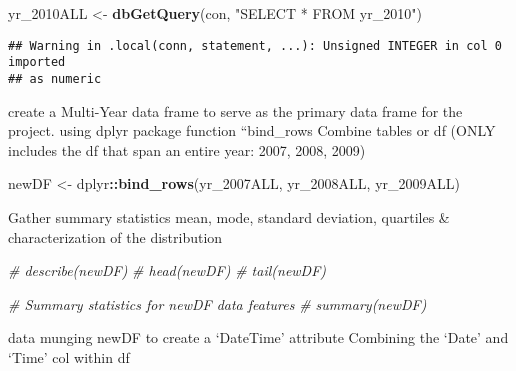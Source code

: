 \documentclass[]{article}
\newenvironment{Shaded}{\begin{snugshade}}{\end{snugshade}}
\newcommand{\CommentTok}[1]{\textcolor[rgb]{0.56,0.35,0.01}{\textit{#1}}}
\newcommand{\DataTypeTok}[1]{\textcolor[rgb]{0.13,0.29,0.53}{#1}}
\newcommand{\KeywordTok}[1]{\textcolor[rgb]{0.13,0.29,0.53}{\textbf{#1}}}
\newcommand{\NormalTok}[1]{#1}
\newcommand{\OperatorTok}[1]{\textcolor[rgb]{0.81,0.36,0.00}{\textbf{#1}}}
\newcommand{\OtherTok}[1]{\textcolor[rgb]{0.56,0.35,0.01}{#1}}
\newcommand{\StringTok}[1]{\textcolor[rgb]{0.31,0.60,0.02}{#1}}
\begin{document}
\begin{Shaded}
\begin{Highlighting}[]
\NormalTok{yr_2010ALL <-}\StringTok{ }\KeywordTok{dbGetQuery}\NormalTok{(con, }\StringTok{"SELECT * FROM yr_2010"}\NormalTok{)}
\end{Highlighting}
\end{Shaded}

\begin{verbatim}
## Warning in .local(conn, statement, ...): Unsigned INTEGER in col 0 imported
## as numeric
\end{verbatim}

create a Multi-Year data frame to serve as the primary data frame for
the project. using dplyr package function ``bind\_rows Combine tables or
df (ONLY includes the df that span an entire year: 2007, 2008, 2009)

\begin{Shaded}
\begin{Highlighting}[]
\NormalTok{newDF <-}\StringTok{ }\NormalTok{dplyr}\OperatorTok{::}\KeywordTok{bind_rows}\NormalTok{(yr_2007ALL, yr_2008ALL, yr_2009ALL)}
\end{Highlighting}
\end{Shaded}

Gather summary statistics mean, mode, standard deviation, quartiles \&
characterization of the distribution

\begin{Shaded}
\begin{Highlighting}[]
\CommentTok{# describe(newDF)}
\CommentTok{# head(newDF)}
\CommentTok{# tail(newDF)}
\end{Highlighting}
\end{Shaded}

\begin{Shaded}
\begin{Highlighting}[]
\CommentTok{# Summary statistics for newDF data features}
\CommentTok{# summary(newDF)}
\end{Highlighting}
\end{Shaded}

data munging newDF to create a `DateTime' attribute Combining the `Date'
and `Time' col within df

\begin{Shaded}
\end{Shaded}
\end{document}

